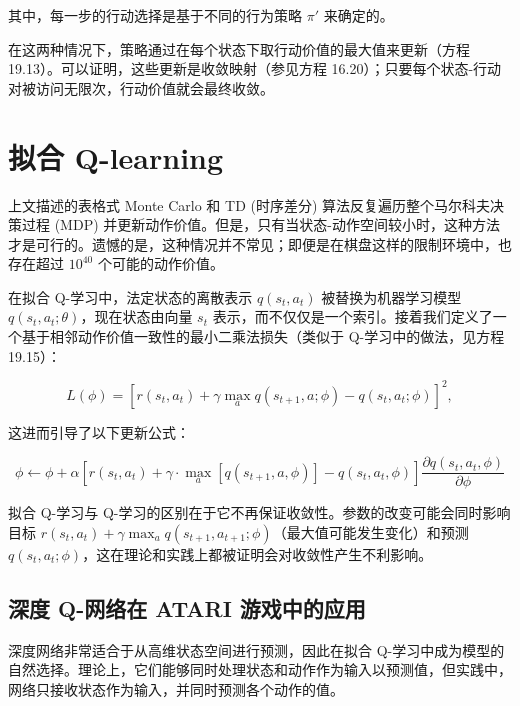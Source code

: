其中，每一步的行动选择是基于不同的行为策略 \(\pi'\) 来确定的。

在这两种情况下，策略通过在每个状态下取行动价值的最大值来更新（方程 19.13）。可以证明，这些更新是收敛映射（参见方程 16.20）；只要每个状态-行动对被访问无限次，行动价值就会最终收敛。

\section{拟合 Q-learning}
上文描述的表格式 Monte Carlo 和 TD (时序差分) 算法反复遍历整个马尔科夫决策过程 (MDP) 并更新动作价值。但是，只有当状态-动作空间较小时，这种方法才是可行的。遗憾的是，这种情况并不常见；即便是在棋盘这样的限制环境中，也存在超过 \(10^{40}\) 个可能的动作价值。

在拟合 Q-学习中，法定状态的离散表示 \(q(s_t, a_t)\) 被替换为机器学习模型 \(q(s_t, a_t; \theta)\)，现在状态由向量 \(s_t\) 表示，而不仅仅是一个索引。接着我们定义了一个基于相邻动作价值一致性的最小二乘法损失（类似于 Q-学习中的做法，见方程 19.15）：

\begin{equation}
L(\phi) = \left[ r(s_t, a_t) + \gamma \max_{a} q(s_{t+1}, a; \phi) - q(s_t, a_t; \phi) \right]^2, 
\end{equation}

这进而引导了以下更新公式：

\begin{equation}
\phi \leftarrow \phi + \alpha \left[ r(s_t, a_t) + \gamma \cdot \max_a [q(s_{t+1}, a, \phi)] - q(s_t, a_t, \phi) \right] \frac{\partial q(s_t, a_t, \phi)}{\partial \phi} 
\end{equation}

拟合 Q-学习与 Q-学习的区别在于它不再保证收敛性。参数的改变可能会同时影响目标 \(r(s_t, a_t) + \gamma \max_{a} q(s_{t+1}, a_{t+1}; \phi)\)（最大值可能发生变化）和预测 \(q(s_t, a_t; \phi)\)，这在理论和实践上都被证明会对收敛性产生不利影响。

\subsection{深度 Q-网络在 ATARI 游戏中的应用}
深度网络非常适合于从高维状态空间进行预测，因此在拟合 Q-学习中成为模型的自然选择。理论上，它们能够同时处理状态和动作作为输入以预测值，但实践中，网络只接收状态作为输入，并同时预测各个动作的值。

